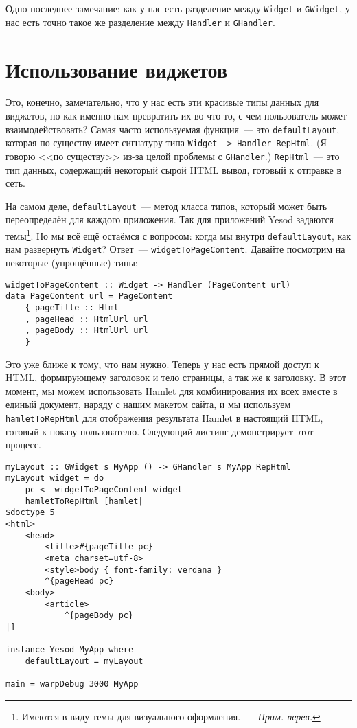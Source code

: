 Одно последнее замечание: как у нас есть разделение между \lstinline'Widget' и
\lstinline'GWidget', у нас есть точно такое же разделение между
\lstinline'Handler' и \lstinline'GHandler'.

\section{Использование виджетов}
Это, конечно, замечательно, что у нас есть эти красивые типы данных для виджетов,
но как именно нам превратить их во что-то, с чем пользователь может
взаимодействовать? Самая часто используемая функция~--- это
\lstinline'defaultLayout', которая по существу имеет сигнатуру типа
\lstinline'Widget -> Handler RepHtml'. (Я говорю <<по существу>> из-за целой
проблемы с \lstinline'GHandler'.) \lstinline'RepHtml'~--- это тип данных,
содержащий некоторый сырой HTML вывод, готовый к отправке в сеть.

На самом деле, \lstinline'defaultLayout'~--- метод класса типов, который может
быть переопределён для каждого приложения. Так для приложений Yesod задаются
темы\footnote{Имеются в виду темы для визуального оформления.~--- \emph{Прим.
перев.}}. Но мы всё ещё остаёмся с вопросом: когда мы внутри
\lstinline'defaultLayout', как нам развернуть \lstinline'Widget'? Ответ~---
\lstinline'widgetToPageContent'. Давайте посмотрим на некоторые (упрощённые)
типы:
\begin{lstlisting}
widgetToPageContent :: Widget -> Handler (PageContent url)
data PageContent url = PageContent
    { pageTitle :: Html
    , pageHead :: HtmlUrl url
    , pageBody :: HtmlUrl url
    }
\end{lstlisting}

Это уже ближе к тому, что нам нужно. Теперь у нас есть прямой доступ к HTML,
формирующему заголовок и тело страницы, а так же к заголовку. В этот момент, мы
можем использовать Hamlet для комбинирования их всех вместе в единый документ,
наряду с нашим макетом сайта, и мы используем \lstinline'hamletToRepHtml' для
отображения результата Hamlet в настоящий HTML, готовый к показу пользователю.
Следующий листинг демонстрирует этот процесс.
\begin{lstlisting}[caption={Использование \lstinline'widgetToPageContent'}]
myLayout :: GWidget s MyApp () -> GHandler s MyApp RepHtml
myLayout widget = do
    pc <- widgetToPageContent widget
    hamletToRepHtml [hamlet|
$doctype 5
<html>
    <head>
        <title>#{pageTitle pc}
        <meta charset=utf-8>
        <style>body { font-family: verdana }
        ^{pageHead pc}
    <body>
        <article>
            ^{pageBody pc}
|]

instance Yesod MyApp where
    defaultLayout = myLayout

main = warpDebug 3000 MyApp
\end{lstlisting}

